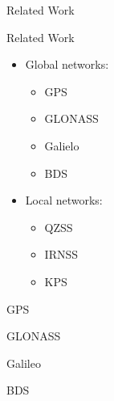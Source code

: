 %
%
%
%
%

%
%
%
%
%


\begin{frame}{Related Work}

\end{frame}

\begin{frame}{Related Work}

    \begin{itemize}
        \item Global networks:
            \begin{itemize}
                \item GPS
                \item GLONASS
                \item Galielo
                \item BDS
            \end{itemize}
        \item Local networks:
            \begin{itemize}
                \item QZSS
                \item IRNSS
                \item KPS
            \end{itemize}
    \end{itemize}

\end{frame}

\begin{frame}{GPS}

\end{frame}

\begin{frame}{GLONASS}

\end{frame}

\begin{frame}{Galileo}

\end{frame}

\begin{frame}{BDS}

\end{frame}

